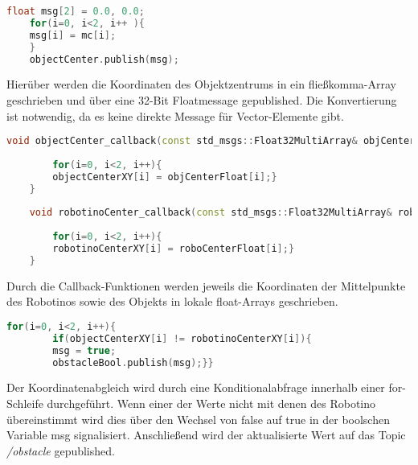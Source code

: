 	 
	\begin{lstlisting}[language = C++]
	float msg[2] = 0.0, 0.0;
	for(i=0, i<2, i++ ){
	msg[i] = mc[i];
	}
	objectCenter.publish(msg);
	\end{lstlisting}
	Hierüber werden die Koordinaten des Objektzentrums in ein fließkomma-Array geschrieben und über eine 32-Bit Floatmessage gepublished. Die Konvertierung ist notwendig, da es keine direkte Message für Vector-Elemente gibt.
	
	\begin{lstlisting}[language = C++]
	void objectCenter_callback(const std_msgs::Float32MultiArray& objCenterFloat){
	
		for(i=0, i<2, i++){
		objectCenterXY[i] = objCenterFloat[i];}
	}
	
	void robotinoCenter_callback(const std_msgs::Float32MultiArray& roboCenterFloat){
	
		for(i=0, i<2, i++){
		robotinoCenterXY[i] = roboCenterFloat[i];}
	}
	\end{lstlisting}
	Durch die Callback-Funktionen werden jeweils die Koordinaten der Mittelpunkte des Robotinos sowie des Objekts in lokale float-Arrays geschrieben.
	
	
	\begin{lstlisting}[language=C++]
		for(i=0, i<2, i++){
		if(objectCenterXY[i] != robotinoCenterXY[i]){
		msg = true;
	    obstacleBool.publish(msg);}}

	\end{lstlisting}
	Der Koordinatenabgleich wird durch eine Konditionalabfrage innerhalb einer for-Schleife durchgeführt. Wenn einer der Werte nicht mit denen des Robotino übereinstimmt wird dies über den Wechsel von false auf true in der boolschen Variable msg signalisiert. Anschließend wird der aktualisierte Wert auf das Topic \textit{/obstacle} gepublished.

	 